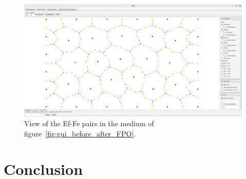 \documentclass{article}
\begin{document}
\begin{figure}[H]
	\centering\includegraphics[width=0.8\linewidth]{assets/EfFe_transfers.png}
	\caption{View of the Ef-Fe pairs in the medium of figure~\ref{fig:gui_before_after_FPO}.}
	\label{fig:gui_EfFe}
\end{figure}

\section{Conclusion}

\printbibliography[heading=bibintoc]
\end{document}
